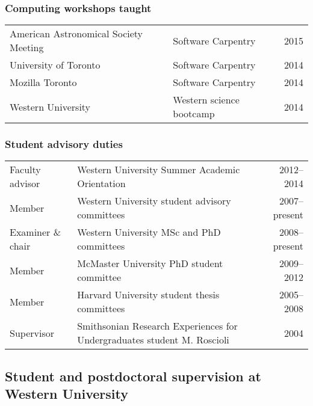 \documentclass[12pt]{article}
\begin{document}
\subsubsection{Computing workshops taught}
\begin{tabularx}{\textwidth}{XXr}
American Astronomical Society Meeting  & Software Carpentry & 2015\\
University of Toronto & Software Carpentry & 2014\\
Mozilla Toronto & Software Carpentry & 2014\\
Western University & Western science bootcamp & 2014\\
\end{tabularx}


\subsubsection{Student advisory duties}
\begin{tabularx}{\textwidth}{lXr}
Faculty advisor& Western University Summer Academic Orientation & 2012--2014\\
Member &Western University student advisory committees & 2007--present\\
Examiner \& chair & Western University MSc and PhD committees& 2008--present\\
Member& McMaster University PhD student committee& 2009--2012\\
Member& Harvard University student thesis committees& 2005--2008\\
Supervisor& Smithsonian Research Experiences for Undergraduates student M. Roscioli& 2004\\
\end{tabularx}



\subsection{Student and postdoctoral supervision at Western University}
\end{document}
